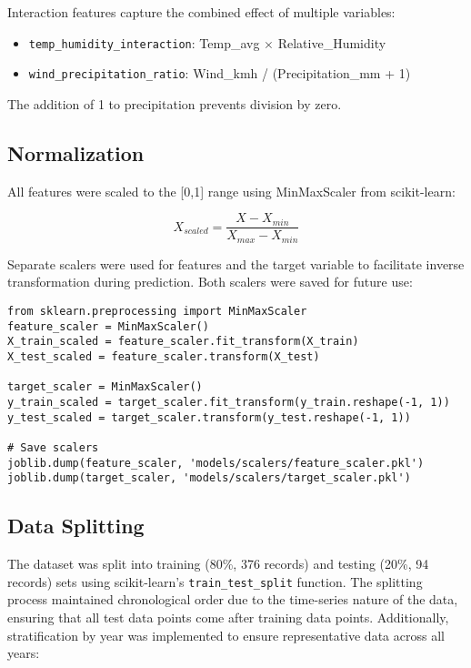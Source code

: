 \documentclass[12pt]{article}
\begin{document}
Interaction features capture the combined effect of multiple variables:
\begin{itemize}
    \item \texttt{temp\_humidity\_interaction}: Temp\_avg $\times$ Relative\_Humidity
    \item \texttt{wind\_precipitation\_ratio}: Wind\_kmh / (Precipitation\_mm + 1)
\end{itemize}

The addition of 1 to precipitation prevents division by zero.

\subsection{Normalization}
\label{subsec:normalization}

All features were scaled to the [0,1] range using MinMaxScaler from scikit-learn:

\begin{equation}
X_{scaled} = \frac{X - X_{min}}{X_{max} - X_{min}}
\end{equation}

Separate scalers were used for features and the target variable to facilitate inverse transformation during prediction. Both scalers were saved for future use:

\begin{verbatim}
from sklearn.preprocessing import MinMaxScaler
feature_scaler = MinMaxScaler()
X_train_scaled = feature_scaler.fit_transform(X_train)
X_test_scaled = feature_scaler.transform(X_test)

target_scaler = MinMaxScaler()
y_train_scaled = target_scaler.fit_transform(y_train.reshape(-1, 1))
y_test_scaled = target_scaler.transform(y_test.reshape(-1, 1))

# Save scalers
joblib.dump(feature_scaler, 'models/scalers/feature_scaler.pkl')
joblib.dump(target_scaler, 'models/scalers/target_scaler.pkl')
\end{verbatim}

\subsection{Data Splitting}
\label{subsec:data_splitting}

The dataset was split into training (80\%, 376 records) and testing (20\%, 94 records) sets using scikit-learn's \texttt{train\_test\_split} function. The splitting process maintained chronological order due to the time-series nature of the data, ensuring that all test data points come after training data points. Additionally, stratification by year was implemented to ensure representative data across all years:
\end{document}

